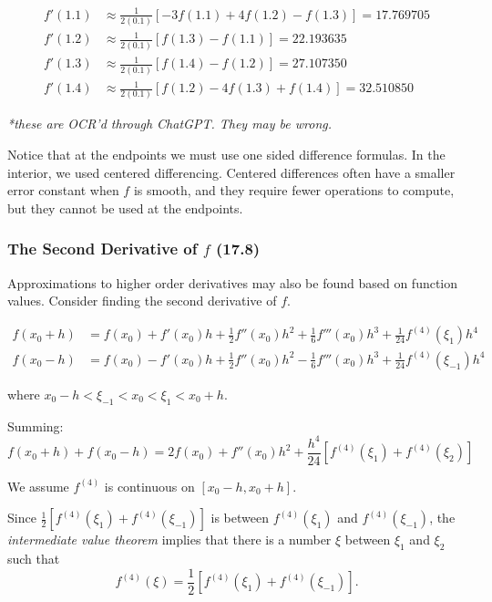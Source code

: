 \begin{align*}
    f'(1.1) &\approx \frac{1}{2(0.1)} \left[ -3f(1.1) + 4f(1.2) - f(1.3) \right] = 17.769705 \\[10pt]
    f'(1.2) &\approx \frac{1}{2(0.1)} \left[ f(1.3) - f(1.1) \right] = 22.193635 \\[10pt]
    f'(1.3) &\approx \frac{1}{2(0.1)} \left[ f(1.4) - f(1.2) \right] = 27.107350 \\[10pt]
    f'(1.4) &\approx \frac{1}{2(0.1)} \left[ f(1.2) - 4f(1.3) + f(1.4) \right] = 32.510850
\end{align*}

\textit{*these are OCR'd through ChatGPT. They may be wrong.}

Notice that at the endpoints we must use one sided difference formulas. In the
interior, we used centered differencing. Centered differences often have a
smaller error constant when $f$ is smooth, and they require fewer operations to
compute, but they cannot be used at the endpoints.

\subsubsection{The Second Derivative of $f$ (17.8)}\label{sec:second_derivative_approximation}
Approximations to higher order derivatives may also be found based on function
values. Consider finding the second derivative of $f$.

\begin{align*}
    f(x_0 + h) &= f(x_0) + f'(x_0) h + \frac{1}{2} f''(x_0) h^2 + \frac{1}{6}
    f'''(x_0) h^3 + \frac{1}{24} f^{(4)}(\xi_1) h^4 \\
    f(x_0 - h) &= f(x_0) - f'(x_0) h + \frac{1}{2} f''(x_0) h^2 - \frac{1}{6}
    f'''(x_0) h^3 + \frac{1}{24} f^{(4)}(\xi_{-1}) h^4
\end{align*}

\noindent where \( x_0 - h < \xi_{-1} < x_0 < \xi_{1} < x_0 + h \).

Summing:
\begin{equation}
    f(x_0 + h) + f(x_0 - h) = 2f(x_0) + f''(x_0) h^2 + \frac{h^4}{24} \left[ f^{(4)}(\xi_1) + f^{(4)}(\xi_2) \right]
    \label{eq:second_derivative_approximation}
\end{equation}

We assume \( f^{(4)} \) is continuous on \( [x_0 - h, x_0 + h] \).

Since
\(
\displaystyle\frac{1}{2} \left[ f^{(4)}(\xi_1) + f^{(4)}(\xi_{-1}) \right]
\)
is between \( f^{(4)}(\xi_1) \) and \( f^{(4)}(\xi_{-1}) \), the 
\textit{intermediate value theorem} implies that there is a number
\( \xi \) between \( \xi_1 \) and \( \xi_2 \) such that
\[
  f^{(4)}(\xi) = \frac{1}{2} \left[ f^{(4)}(\xi_1) + f^{(4)}(\xi_{-1}) \right].
\]

